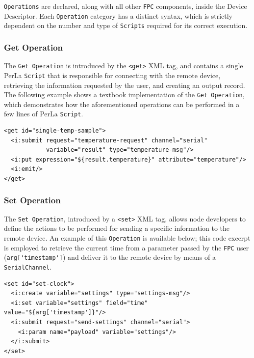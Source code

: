 \texttt{Operations} are declared, along with all other \texttt{FPC} components,
inside the Device Descriptor. Each \texttt{Operation} category has a distinct
syntax, which is strictly dependent on the number and type of \texttt{Scripts}
required for its correct execution. 

\subsubsection{Get Operation}

The \texttt{Get Operation} is introduced by the \lstinline!<get>! XML tag, and
contains a single PerLa \texttt{Script} that is responsible for connecting with
the remote device, retrieving the information requested by the user, and
creating an output record. The following example shows a textbook
implementation of the \texttt{Get Operation}, which demonstrates how the
aforementioned operations can be performed in a few lines of PerLa
\texttt{Script}.

\lstset{language=XML}
\begin{lstlisting}
<get id="single-temp-sample">
  <i:submit request="temperature-request" channel="serial"
            variable="result" type="temperature-msg"/>
  <i:put expression="${result.temperature}" attribute="temperature"/>
  <i:emit/>
</get>
\end{lstlisting}

\subsubsection{Set Operation}

The \texttt{Set Operation}, introduced by a \lstinline!<set>! XML tag, allows
node developers to define the actions to be performed for sending a specific
information to the remote device. An example of this \texttt{Operation} is
available below; this code excerpt is employed to retrieve the current time
from a parameter passed by the \texttt{FPC} user (\lstinline!arg['timestamp']!)
and deliver it to the remote device by means of a \texttt{SerialChannel}.

\lstset{language=XML}
\begin{lstlisting}
<set id="set-clock">
  <i:create variable="settings" type="settings-msg"/>
  <i:set variable="settings" field="time" value="${arg['timestamp']}"/>
  <i:submit request="send-settings" channel="serial">
    <i:param name="payload" variable="settings"/>
  </i:submit>
</set>
\end{lstlisting}


